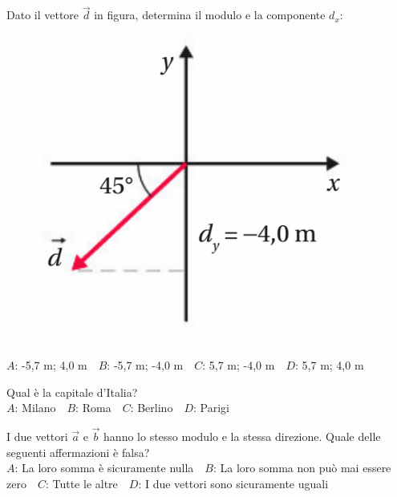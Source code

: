 \mcquestionheader Dato il vettore $\vec{d}$ in figura, determina il modulo e la componente $d_x$: \begin{figure}[h!]   \begin{center}     \includegraphics[scale=0.35]{vettored.png}   \end{center} \end{figure}\\
{$A$}: -5,7 m; 4,0 m\ \ {$B$}: -5,7 m; -4,0 m\ \ {$C$}: 5,7 m; -4,0 m\ \ {$D$}: 5,7 m; 4,0 m\ \ 

\mcquestionfooter



\def\mcquestionnumber{11}


\mcquestionheader Qual è la capitale d’Italia?\\
{$A$}: Milano\ \ {$B$}: Roma\ \ {$C$}: Berlino\ \ {$D$}: Parigi\ \ 

\mcquestionfooter



\def\mcquestionnumber{12}


\mcquestionheader I due vettori $\vec{a}$ e $\vec{b}$ hanno lo stesso modulo e la stessa direzione. Quale delle seguenti affermazioni è falsa?\\
{$A$}: La loro somma è sicuramente nulla\ \ {$B$}: La loro somma non può mai essere zero\ \ {$C$}: Tutte le altre\ \ {$D$}: I due vettori sono sicuramente uguali\ \ 

\mcquestionfooter



\mcpaperfooter

\def\mcserialnumber{12}
\mcpaperheader


